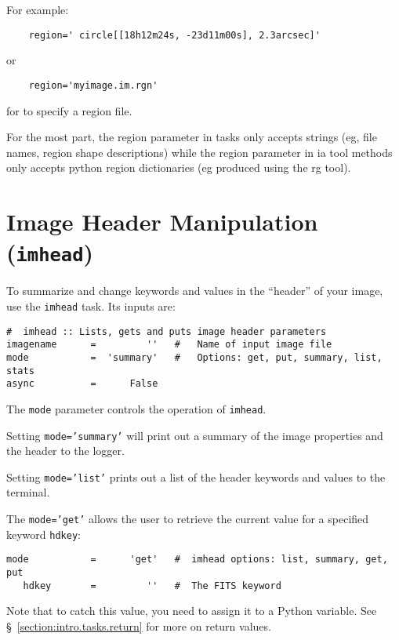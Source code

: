 For example: 
\small
\begin{verbatim}
    region=' circle[[18h12m24s, -23d11m00s], 2.3arcsec]'
\end{verbatim}
\normalsize

or

\small
\begin{verbatim}
    region='myimage.im.rgn'
\end{verbatim}
\normalsize

for to specify a region file. 


For the most part, the region parameter in tasks only
accepts strings (eg, file names, region shape descriptions) while the
region parameter in ia tool methods only accepts python region
dictionaries (eg produced using the rg tool).


\section{Image Header Manipulation ({\tt imhead})}
\label{section:analysis.imhead}

To summarize and change keywords and values in the ``header'' of
your image, use the {\tt imhead} task.  Its inputs are:
\small
\begin{verbatim}
#  imhead :: Lists, gets and puts image header parameters
imagename      =         ''   #   Name of input image file
mode           =  'summary'   #   Options: get, put, summary, list, stats
async          =      False      
\end{verbatim}
\normalsize

The {\tt mode} parameter controls the operation of {\tt imhead}.

Setting {\tt mode='summary'} will print out a summary of the image
properties and the header to the logger.

Setting {\tt mode='list'} prints out a list of the header keywords
and values to the terminal.

The {\tt mode='get'} allows the user to retrieve the current value 
for a specified keyword {\tt hdkey}:
\small
\begin{verbatim}
mode           =      'get'   #  imhead options: list, summary, get, put
   hdkey       =         ''   #  The FITS keyword
\end{verbatim}
\normalsize
Note that to catch this value, you need to assign it to a Python
variable.
See \S~\ref{section:intro.tasks.return} for more on return values.

